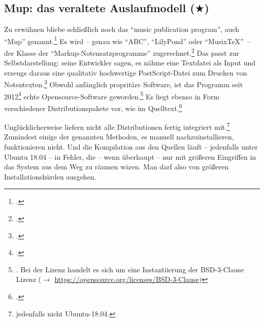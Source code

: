 %
%
%



\subsection{Mup: das veraltete Auslaufmodell ($\bigstar$)}

Zu erwähnen bliebe schließlich noch das \enquote{music publication program},
auch \enquote{Mup} genannt.\footcite[vgl.][\nopage wp]{Arkka2017a} Es wird --
genau wie \enquote{ABC}, \enquote{LilyPond} oder
\enquote{Musix\TeX}\ -- der Klasse der \enquote{Markup-Notensatzprogramme}
zugerechnet.\footcite[vgl.][\nopage wp]{WpedNotensatz2019a} Das passt zur
Selbstdarstellung: seine Entwickler sagen, es nähme eine Textdatei als Input und
erzeuge daraus eine qualitativ hochwertige PostScript-Datei zum Drucken von
Notentexten.\footcite[vgl.][\nopage wp]{Arkka2017a} Obwohl anfänglich propritäre
Software, ist das Programm seit 2012\footcite[vgl.][\nopage wp]{Arkka2017a}
echte Opensource-Software geworden.\footnote{\cite[vgl.][\nopage
wp]{Arkka2017b}.
Bei der Lizenz handelt es sich um eine Instantiierung der BSD-3-Clause Lizenz
($\rightarrow$ \href{https://opensource.org/licenses/BSD-3-Clause}
{https://opensource.org/licenses/BSD-3-Clause})} Es liegt ebenso in Form
verschiedener Distributionspakete vor, wie im Quelltext.\footcite[vgl.][\nopage
wp]{Arkka2017c}

Unglücklicherweise liefern nicht alle Distributionen  fertig integriert
mit.\footnote{jedenfalls nicht Ubuntu-18.04.} Zumindest einige der genannten
Methoden, es manuell nachzuinstallieren, funktionieren nicht. Und die
Kompilation aus den Quellen läuft -- jedenfalls unter Ubuntu 18.04 -- in Fehler,
die -- wenn überhaupt -- nur mit größeren Eingriffen in das System aus dem Weg
zu räumen wären. Man darf also von größeren Installationshürden ausgehen.

